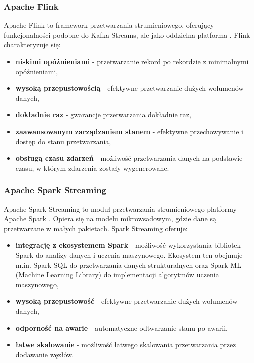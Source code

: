\subsubsection{Apache Flink}
\label{subsubsec:apache_flink}

Apache Flink to framework przetwarzania strumieniowego, oferujący funkcjonalności podobne do Kafka Streams,
ale jako oddzielna platforma \citep{flink}. Flink charakteryzuje się:

\begin{itemize}
    \item \textbf{niskimi opóźnieniami} - przetwarzanie rekord po rekordzie z minimalnymi opóźnieniami,
    \item \textbf{wysoką przepustowością} - efektywne przetwarzanie dużych wolumenów danych,
    \item \textbf{dokładnie raz} - gwarancje przetwarzania dokładnie raz,
    \item \textbf{zaawansowanym zarządzaniem stanem} - efektywne przechowywanie i dostęp do stanu przetwarzania,
    \item \textbf{obsługą czasu zdarzeń} - możliwość przetwarzania danych na podstawie czasu, w którym zdarzenia zostały wygenerowane.
\end{itemize}

\subsubsection{Apache Spark Streaming}
\label{subsubsec:spark_streaming}

Apache Spark Streaming to moduł przetwarzania strumieniowego platformy Apache Spark \citep{spark_streaming}.
Opiera się na modelu mikrowsadowym, gdzie dane są przetwarzane w małych pakietach. Spark Streaming oferuje:

\begin{itemize}
    \item \textbf{integrację z ekosystemem Spark} - możliwość wykorzystania bibliotek Spark do analizy danych i uczenia maszynowego. Ekosystem ten obejmuje m.in. Spark SQL do przetwarzania danych strukturalnych oraz Spark ML (Machine Learning Library) do implementacji algorytmów uczenia maszynowego,
    \item \textbf{wysoką przepustowość} - efektywne przetwarzanie dużych wolumenów danych,
    \item \textbf{odporność na awarie} - automatyczne odtwarzanie stanu po awarii,
    \item \textbf{łatwe skalowanie} - możliwość łatwego skalowania przetwarzania przez dodawanie węzłów.
\end{itemize}

